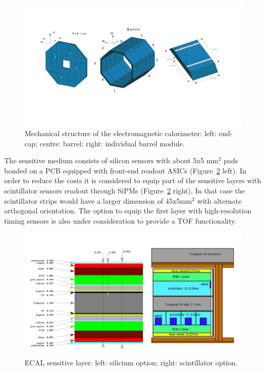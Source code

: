 \begin{figure}[t!]
\centering
\includegraphics[width=1.2\hsize]{Detector/fig/ECAL_structure.jpg}
\caption{Mechanical structure of the electromagnetic calorimeter: left: end-cap; centre: barrel; right: individual barrel module.}
\label{fig:det:ECAL}
\end{figure}

The sensitive medium consists of silicon sensors with about 5x5 mm$^2$ pads bonded on a PCB equipped with front-end readout ASICs (Figure~\ref{fig:det:ECAL_readout} left). In order to reduce the costs it is considered to equip part of the sensitive layers with scintillator sensors readout through SiPMs (Figure~\ref{fig:det:ECAL_readout} right). In that case the scintillator strips would have a larger dimension of 45x5mm$^2$ with alternate orthogonal orientation. The option to equip the first layer with high-resolution timing sensors is also under consideration to provide a TOF functionality.

\begin{figure}[t!]
\centering
\includegraphics[width=1.0\hsize]{Detector/fig/ECAL_readout.jpg}
\caption{ECAL sensitive layer: left: silicium option; right: scintillator option.}
\label{fig:det:ECAL_readout}
\end{figure}


